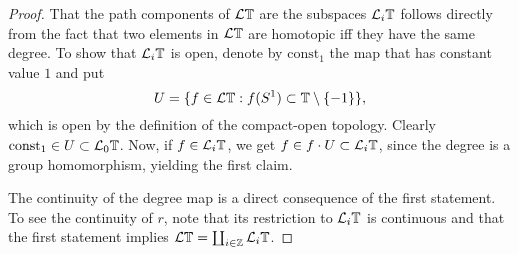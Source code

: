 \begin{proof}
That the path components of $\mathcal{L}\mathbb{T}$ are the subspaces
$\mathcal{L}_i\mathbb{T}$ follows directly from the fact that two elements in $\mathcal{L}\mathbb{T}$
are homotopic iff they have the same degree. To show that $\mathcal{L}_i\mathbb{T}$
is open, denote by $\mathrm{const}_1$ the map that has constant value $1$
and put 
\[
U = \{f\in \mathcal{L}\mathbb{T}: f(S^1)\subset \mathbb{T}\setminus\{-1\}\},
\]
which is open by the definition of the compact-open topology. Clearly $
\mathrm{const}_1\in U\subset \mathcal{L}_0\mathbb{T}$. Now, if $f\in \mathcal{L}_i\mathbb{T}$,
we get $f\in f\cdot U\subset \mathcal{L}_i\mathbb{T}$, since the degree is a group homomorphism,
yielding the first claim.




The continuity of the degree map is a direct consequence of the first statement.
To see the continuity of $r$, note that its restriction to $\mathcal{L}_i\mathbb{T}$
is continuous and that the first statement implies $\mathcal{L} \mathbb{T}= \coprod_{i\in \mathbb{Z}}
\mathcal{L}_i\mathbb{T}$.
\end{proof}
